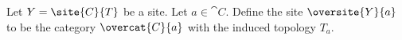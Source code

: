 \begin{definition}[Oversite]
Let $Y = \site{C}{T}$ be a site.
Let $a\in \cat{C}$.
Define the site $\oversite{Y}{a}$ to be the category $\overcat{C}{a}$ with the induced topology $T_a$.
\end{definition}